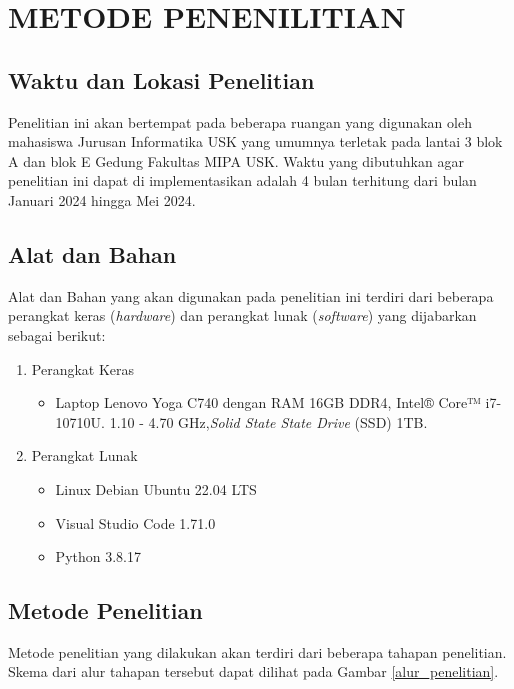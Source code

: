 \chapter{METODE PENENILITIAN}
\section{Waktu dan Lokasi Penelitian}
Penelitian ini akan bertempat pada beberapa ruangan yang digunakan oleh mahasiswa Jurusan Informatika USK yang umumnya terletak pada lantai 3 blok A dan blok E Gedung Fakultas MIPA USK. Waktu yang dibutuhkan agar penelitian ini dapat di implementasikan adalah 4 bulan terhitung dari bulan Januari 2024 hingga Mei 2024.

\section{Alat dan Bahan}
Alat dan Bahan yang akan digunakan pada penelitian ini terdiri dari beberapa perangkat keras (\textit{hardware}) dan perangkat lunak (\textit{software}) yang dijabarkan sebagai berikut:

\begin{enumerate}
\item Perangkat Keras
	\begin{itemize}
	\item Laptop Lenovo Yoga C740 dengan RAM 16GB DDR4, Intel® Core™ i7-10710U. 1.10 - 4.70 GHz,\textit{Solid State State Drive} (SSD) 1TB.
	\end{itemize}

\item Perangkat Lunak
	\begin{itemize}
	\item Linux Debian Ubuntu 22.04 LTS
	\item Visual Studio Code 1.71.0
	\item Python 3.8.17
	\end{itemize}
\end{enumerate}
\newpage
\section{Metode Penelitian}
Metode penelitian yang dilakukan akan terdiri dari beberapa tahapan penelitian. Skema dari alur tahapan tersebut dapat dilihat pada Gambar \ref{alur_penelitian}.

